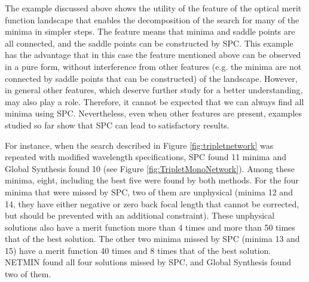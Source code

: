 The example discussed above shows the utility of the feature of the optical merit function landscape that enables the decomposition of the search for many of the minima in simpler steps. The feature means that minima and saddle points are all connected, and the saddle points can be constructed by SPC. This example has the advantage that in this case the feature mentioned above can be observed in a pure form, without interference from other features (e.g. the minima are not connected by saddle points that can be constructed) of the landscape. However, in general other features, which deserve further study for a better understanding, may also play a role. Therefore, it cannot be expected that we can always find all minima using SPC. Nevertheless, even when other features are present, examples studied so far show that SPC can lead to satisfactory results.

For instance, when the search described in Figure \ref{fig:tripletnetwork} was repeated with modified wavelength specifications, SPC found 11 minima and Global Synthesis found 10 (see Figure \ref{fig:TripletMonoNetwork}). Among these minima, eight, including the best five were found by both methods. For the four minima that were missed by SPC, two of them are unphysical (minima 12 and 14, they have either negative or zero back focal length that cannot be corrected, but should be prevented with an additional constraint). These unphysical solutions also have a merit function more than 4 times and more than 50 times that of the best solution. The other two minima missed by SPC (minima 13 and 15) have a merit function 40 times and 8 times that of the best solution. NETMIN found all four solutions missed by SPC, and Global Synthesis found two of them.



